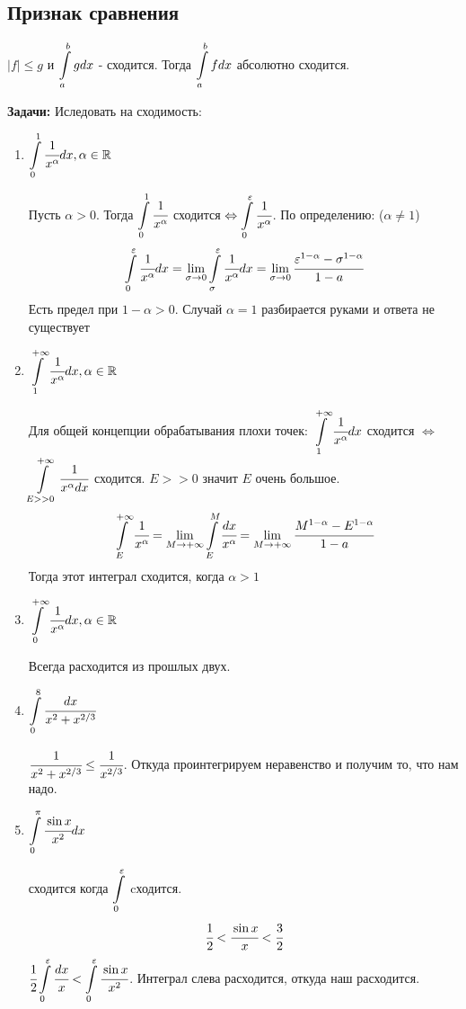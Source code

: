 \subsection{Признак сравнения}

$|f|\leq g$ и $\displaystyle\int\limits_{a}^{b} gdx$ - сходится. Тогда $\displaystyle\int\limits_{a}^{b}f dx$ абсолютно сходится.

\textbf{Задачи:} Иследовать на сходимость:
\begin{enumerate}
    \item $\displaystyle\int\limits_{0}^{1}\cfrac{1}{x^{\alpha}}dx , \alpha\in \mathbb{R}$

    Пусть $\alpha >0$. Тогда $\displaystyle\int\limits_{0}^{1}\cfrac{1}{x^{\alpha}}$ сходится $\Leftrightarrow \displaystyle\int\limits_{0}^{\varepsilon} \cfrac{1}{x^{\alpha}}$. По определению: ($\alpha \neq 1$)
    $$\displaystyle\int\limits_{0}^{\varepsilon}\cfrac{1}{x^{\alpha}}dx = \lim\limits_{\sigma\rightarrow 0} \displaystyle\int\limits_{\sigma}^{\varepsilon}\cfrac{1}{x^{\alpha}}dx = \lim\limits_{\sigma \rightarrow 0 }\cfrac{\varepsilon^{1-\alpha}-\sigma^{1-\alpha}}{1-a}$$
    Есть предел при $1-\alpha >0$. Случай $\alpha = 1$ разбирается руками и ответа не существует
    
     \item $\displaystyle\int\limits_{1}^{+\infty}\cfrac{1}{x^{\alpha}}dx , \alpha\in \mathbb{R}$

        Для общей концепции обрабатывания плохи точек:
        $\displaystyle\int\limits_{1}^{+\infty} \cfrac{1}{x^{\alpha}}dx $ сходится $\Leftrightarrow$ $\displaystyle\int\limits_{E>>0}^{+\infty} \cfrac{1}{x^{\alpha}dx}$ сходится. $E>>0$ значит $E$ очень большое.
        $$\displaystyle\int\limits_{E}^{+\infty} \cfrac{1}{x^{\alpha}} = \lim\limits_{M\rightarrow +\infty}\displaystyle\int\limits_{E}^{M}\cfrac{dx}{x^{\alpha}}=\lim\limits_{M \rightarrow +\infty}\cfrac{M^{1-\alpha}-E^{1-\alpha}}{1-a}$$
        Тогда этот интеграл сходится, когда $\alpha>1$
     
      \item $\displaystyle\int\limits_{0}^{+\infty}\cfrac{1}{x^{\alpha}}dx , \alpha\in \mathbb{R}$

      Всегда расходится из прошлых двух.

      \item $\displaystyle\int\limits_{0}^{8}\cfrac{dx}{x^2+x^{2/3}}$

      $\cfrac{1}{x^2+x^{2/3}} \leq \cfrac{1}{x^{2/3}}$. Откуда проинтегрируем неравенство и получим то, что нам надо.

      \item $\displaystyle\int\limits_{0}^{\pi}\cfrac{\sin x}{x^2}dx$

      сходится когда $\displaystyle\int\limits_{0}^{\varepsilon}$ cходится.
      $$\cfrac{1}{2}<\cfrac{\sin x}{x}< \cfrac{3}{2}$$
      $\cfrac{1}{2}\displaystyle\int\limits_{0}^{\varepsilon}\cfrac{dx}{x}<\displaystyle\int\limits_{0}^{\varepsilon}\cfrac{\sin x}{x^2}$. Интеграл слева расходится, откуда наш расходится.


\end{enumerate}
